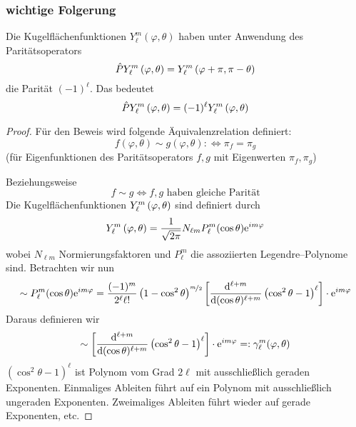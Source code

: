 \documentclass[Ex4_Zusammenfassung.tex]{subfiles}
\begin{document}
\subsubsection*{wichtige Folgerung}
Die Kugelflächenfunktionen $Y_\ell^m(\varphi, \theta)$ haben unter Anwendung des Paritätsoperators 
\begin{equation}
	\hat{P} Y_\ell^m \left( \varphi, \theta\right) = Y_\ell^m \left( \varphi + \pi, \pi - \theta\right)
\end{equation}
die Parität $(-1)^\ell$. Das bedeutet
\begin{equation}
	\hat{P} Y_\ell^m \left( \varphi, \theta\right) = (-1)^\ell Y_\ell^m \left( \varphi, \theta\right)
\end{equation}
\begin{proof}
	Für den Beweis wird folgende Äquivalenzrelation definiert:
	\begin{equation}
		f(\varphi, \theta) \sim g(\varphi, \theta) : \Leftrightarrow \pi_f = \pi_g
	\end{equation}
	(für Eigenfunktionen des Paritätsoperators $f,g$ mit Eigenwerten $\pi_f, \pi_g$)
	
	Beziehungsweise
	\begin{equation}
		f \sim g \Leftrightarrow f,g \text{ haben gleiche Parität}
	\end{equation}
	Die Kugelflächenfunktionen $Y_\ell^m \left( \varphi, \theta\right)$ sind definiert durch
	\begin{equation}
		Y_\ell^m \left( \varphi, \theta\right) = \frac{1}{\sqrt{2\pi}} N_{\ell m} P_\ell^m (\cos \theta ) \mathrm{e}^{im\varphi}
	\end{equation}
	wobei $N_{\ell m}$ Normierungsfaktoren und $P_\ell^m$ die assoziierten Legendre--Polynome sind. Betrachten wir nun 
	\begin{equation*}
		\sim P_\ell^m (\cos \theta) \mathrm{e}^{im\varphi} = \frac{(-1)^m}{2^\ell \ell!} \left( 1 - \cos^2\theta \right)^{\nicefrac{m}{2}} \left[ \frac{\mathrm{d} ^{\ell+m}}{\mathrm{d} (\cos \theta)^{\ell+m}} \left( \cos^2 \theta - 1 \right)^\ell \right] \cdot \mathrm{e}^{im\varphi}
	\end{equation*}
	Daraus definieren wir 
	\begin{equation}
		\sim\left[ \frac{\mathrm{d} ^{\ell + m}}{\mathrm{d} (\cos \theta)^{\ell + m}} \left( \cos^2 \theta - 1 \right)^\ell \right] \cdot \mathrm{e}^{im\varphi} =: \gamma_\ell^m(\varphi, \theta)
	\end{equation}
	$(\cos^2 \theta -1)^\ell$ ist Polynom vom Grad $2\ell$ mit ausschließlich geraden Exponenten. Einmaliges Ableiten führt auf ein Polynom mit ausschließlich ungeraden Exponenten. Zweimaliges Ableiten führt wieder auf gerade Exponenten, etc.
	

\end{proof}
\end{document}
